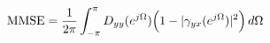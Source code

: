 \documentclass[preview]{standalone}
\begin{document}
\begin{align*}
\special{dvisvgm:raw <g id='unique000'>}\text{MMSE}=\frac{1}{2\pi}\int_{-\pi}^{\pi}D_{yy}(e^{j\Omega})\Big(1-|\gamma_{yx}(e^{j\Omega})|^2\Big)\,d\Omega\special{dvisvgm:raw </g>}
\end{align*}
\end{document}
